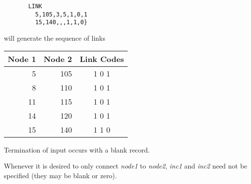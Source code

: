 \begin{verbatim}
       LINK
         5,105,3,5,1,0,1
         15,140,,,1,1,0}
\end{verbatim}
will generate the sequence of links
\begin{center}
\begin{tabular}{r|r|c}
Node 1& Node 2& Link Codes \\ \hline
 5& 105& 1 0 1 \\
 8& 110& 1 0 1 \\
11& 115& 1 0 1 \\
14& 120& 1 0 1 \\
15& 140& 1 1 0
\end{tabular}
\end{center}
Termination of input occurs with a blank record.

Whenever it is desired to only connect {\it node1} to
{\it node2}, {\it inc1} and {\it inc2} need not be specified (they may
be blank or zero).
\vfil\eject
